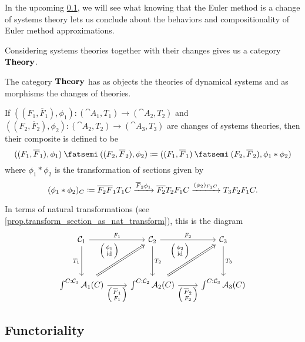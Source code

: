 \documentclass[DynamicalBook]{subfiles}
\begin{document}

In the upcoming \cref{sec:functoriality.of.sys}, we will see what knowing that
the Euler method is a change of systems theory lets us conclude about the behaviors
and compositionality of Euler method approximations. 

Considering systems theories together with their changes gives us a category
$\textbf{Theory}$.

\begin{definition}\label{def.category_of_doctrines}
  The category $\textbf{Theory}$ has as objects the theories of dynamical systems
  and as morphisms the changes of theories.

  If $((F_1, \overline{F}_1), \phi_1) : (\cat{A}_1, T_1) \to (\cat{A}_2, T_2)$
  and $((F_2, \overline{F}_2), \phi_2) : (\cat{A}_2, T_2) \to (\cat{A}_3, T_3)$
  are changes of systems theories, then their composite is defined to be
  \[
((F_1, \overline{F}_1), \phi_1) \then ((F_2, \overline{F}_2), \phi_2) \coloneqq
((F_1, \overline{F}_1)\then(F_2, \overline{F}_2), \phi_1 \ast \phi_2)
\]
where $\phi_1 \ast \phi_2$ is the transformation of sections given by
\[
(\phi_1 \ast \phi_2)_C \coloneqq \overline{F_2}\overline{F}_1 T_1 C
\xrightarrow{\overline{F}_2 \phi_1} \overline{F_2} T_2 F_1 C \xrightarrow{(\phi_2)_{F_1 C}} T_3
F_2 F_1 C.
\]

In terms of natural transformations (see
\cref{prop.transform_section_as_nat_transform}), this is the diagram
\[
  \begin{tikzcd}[row sep = huge]
    \cat{C}_1 \ar[r, "F_1"]\ar[d, "T_1"'] & \cat{C}_2\ar[r, "F_2"]\ar[d, "T_2"] & \cat{C}_3\ar[d, "T_3"] \\
    \int^{C : \cat{C}_1}\cat{A}_1(C)\ar[r, "{\lens{\overline{F}_1}{F_1}}"']
    \ar[ur, Rightarrow, "{\littlelens{\phi_1}{\id}}"] &\int^{C : \cat{C}_2}\cat{A}_2(C)\ar[r, "{\lens{\overline{F}_2}{F_2}}"']\ar[ur, Rightarrow, "{\littlelens{\phi_2}{\id}}"] &\int^{C : \cat{C}_3}\cat{A}_3(C) 
  \end{tikzcd}
\]
\end{definition}



\subsection{Functoriality}\label{sec:functoriality.of.sys}
\end{document}
